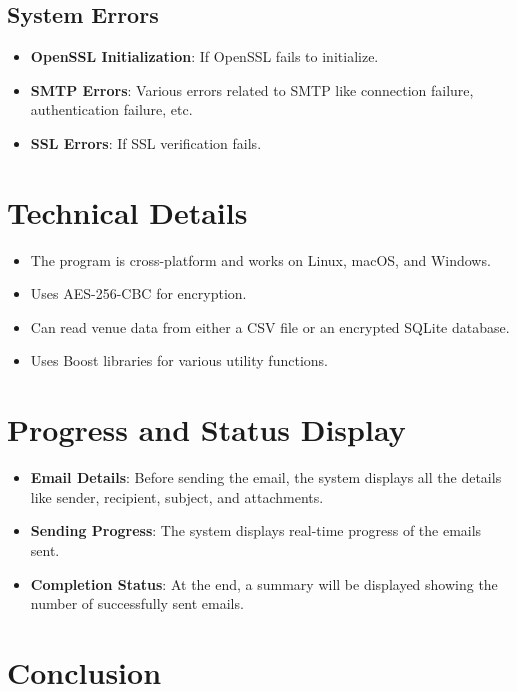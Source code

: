 \documentclass{article}
\begin{document}
	\subsection{System Errors}
	
	\begin{itemize}
		\item \textbf{OpenSSL Initialization}: If OpenSSL fails to initialize.
		\item \textbf{SMTP Errors}: Various errors related to SMTP like connection failure, authentication failure, etc.
		\item \textbf{SSL Errors}: If SSL verification fails.
	\end{itemize}
	
	\section{Technical Details}
	
	\begin{itemize}
		\item The program is cross-platform and works on Linux, macOS, and Windows.
		\item Uses AES-256-CBC for encryption.
		\item Can read venue data from either a CSV file or an encrypted SQLite database.
		\item Uses Boost libraries for various utility functions.
	\end{itemize}
	
	\section{Progress and Status Display}
	
	\begin{itemize}
		\item \textbf{Email Details}: Before sending the email, the system displays all the details like sender, recipient, subject, and attachments.
		\item \textbf{Sending Progress}: The system displays real-time progress of the emails sent.
		\item \textbf{Completion Status}: At the end, a summary will be displayed showing the number of successfully sent emails.
	\end{itemize}

	\section{Conclusion}
\end{document}

